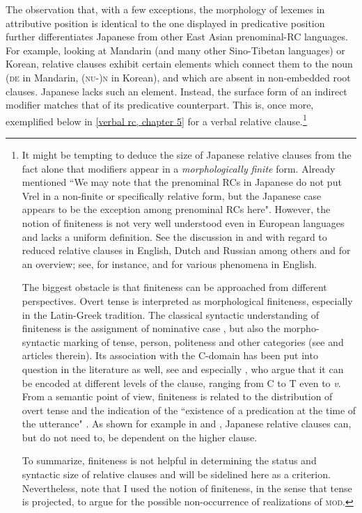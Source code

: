 \largerpage
The observation that, with a few exceptions, the morphology of lexemes in attributive position is identical to the one displayed in predicative position further differentiates Japanese from other East Asian prenominal-RC languages. For example, looking at  Mandarin (and many other Sino-Tibetan languages) or  Korean, relative clauses exhibit certain elements which connect them to the noun (\textsc{de} in Mandarin, \textsc{(nu-)n} in Korean),  and which are absent in non-embedded root clauses. Japanese lacks such an element. Instead, the surface form of an indirect modifier matches that of its predicative counterpart. This is, once more, exemplified below in \ref{verbal rc, chapter 5} for a verbal relative clause.\footnote{It might be tempting to deduce the size of Japanese relative clauses from the fact alone that modifiers appear in a \textit{morphologically} \textit{finite} form. Already \citet[156]{keenan:1985:relcl} mentioned ``We may note that the prenominal RCs in Japanese do not put Vrel in a non-finite or specifically relative form, but the Japanese case appears to be the exception among prenominal RCs here". However, the notion of finiteness is not very well understood even in European languages and lacks a uniform definition. See the discussion in \citet{hudson:1973:tense, stanton:2011:rrc, belikova:2008:syntactically} and \citet{belk:2017:attributes} with regard to reduced relative clauses in English, Dutch and Russian among others and \citet{nikolaeva:2007:intro} for an overview; see, for instance, \citet{wurmbrand:2005:infinitives, wurmbrand:2014:tense} and \citet{landau:2004:scale, landau:2013:control} for various phenomena in English.

The biggest obstacle is that finiteness can be approached from different perspectives. Overt tense is interpreted as morphological finiteness, especially in the Latin-Greek tradition. The classical syntactic understanding of finiteness is the assignment of nominative case \citep{chomsky:1981:lectures}, but also the morpho-syntactic marking of tense, person, politeness and other categories (see \citealt{nikolaeva:2007:intro} and articles therein). Its association with the C-domain has been put into question in the literature as well, see \citet{adger:2007:finiteness, bisang:2007:finiteness} and especially \citet{wurmbrand:2020:finiteness}, who argue that it can be encoded at different levels of the clause, ranging from C to T even to \textit{v}. From a semantic point of view, finiteness is related to the distribution of overt tense and the indication of the ``existence of a predication at the time of the utterance" \citep[201]{platzack:1995:loss}. As shown for example in \citet{ogihara:1994:adverbs} and \citet{miyagawa:2012:case}, Japanese relative clauses can, but do not need to, be dependent on the higher clause.

To summarize, finiteness is not helpful in determining the status and syntactic size of relative clauses and will be sidelined here as a criterion. Nevertheless, note that I used the notion of finiteness, in the sense that tense is projected, to argue for the possible non-occurrence of realizations of \textsc{mod}.}    

